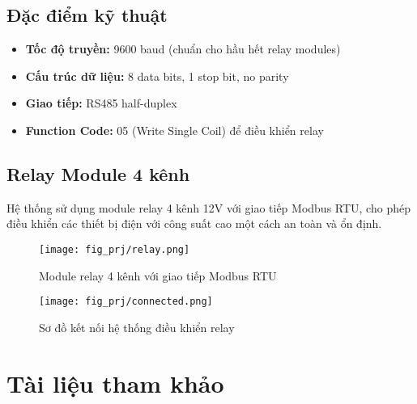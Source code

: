 \documentclass[12pt]{article}
\begin{document}
\subsection{Đặc điểm kỹ thuật}
\begin{itemize}
    \item \textbf{Tốc độ truyền:} 9600 baud (chuẩn cho hầu hết relay modules)
    \item \textbf{Cấu trúc dữ liệu:} 8 data bits, 1 stop bit, no parity
    \item \textbf{Giao tiếp:} RS485 half-duplex
    \item \textbf{Function Code:} 05 (Write Single Coil) để điều khiển relay
\end{itemize}

\subsection{Relay Module 4 kênh}
Hệ thống sử dụng module relay 4 kênh 12V với giao tiếp Modbus RTU, cho phép điều khiển các thiết bị điện với công suất cao một cách an toàn và ổn định.

\begin{figure}[!ht]
    \centering
    \texttt{[image: fig\_prj/relay.png]}
    \caption{Module relay 4 kênh với giao tiếp Modbus RTU}
    \label{fig:relay-module}
\end{figure}

\begin{figure}[!ht]
    \centering
    \texttt{[image: fig\_prj/connected.png]}
    \caption{Sơ đồ kết nối hệ thống điều khiển relay}
    \label{fig:system-connection}
\end{figure}

\newpage
\setcounter{tocdepth}{3} 
\tableofcontents
\thispagestyle{fancy}
\newpage



\newpage
\section{Tài liệu tham khảo}
\label{section:references}
\nocite{*}
\vspace{-3.2em}   
\printbibliography
\end{document}
